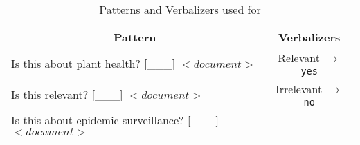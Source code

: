 \begin{table}%
    \centering
    \begin{tabular}{l|c}
     \multicolumn{1}{c|}{\textbf{Pattern}} &  \textbf{Verbalizers} \\ \hline
      Is this about plant health? [\_\_\_] $<document>$   & Relevant $\to$ \texttt{yes} \\
      Is this relevant? [\_\_\_] $<document>$   & Irrelevant $\to$ \texttt{no} \\
      Is this about epidemic surveillance? [\_\_\_] $<document>$   & \
    \end{tabular}
    \caption{Patterns and Verbalizers used for \PET{} }
    \label{tab:06_pet_patterns_and_verbalizers}
\end{table}
